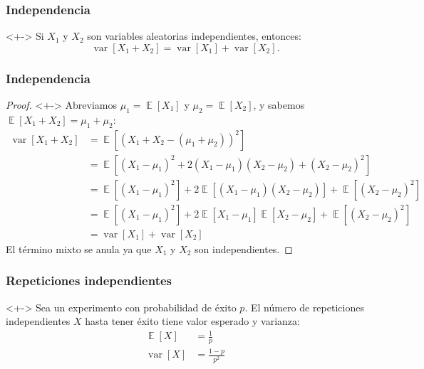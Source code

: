 \documentclass[english, spanish, fleqn,%
hyperref = {colorlinks, urlcolor = blue}%
]{beamer}
\DeclareMathOperator{\Exp}{\mathbb{E}}
\DeclareMathOperator{\var}{var}
\begin{document}
\begin{frame}
  \setcounter{beamerpauses}{2}
  \frametitle{Independencia}

  \begin{theorem}<+->
    Si \(X_1\) y \(X_2\) son variables aleatorias independientes,
    entonces:
    \begin{equation*}
      \var[X_1 + X_2]
        = \var[X_1] + \var[X_2].
    \end{equation*}
  \end{theorem}
\end{frame}

\begin{frame}
  \setcounter{beamerpauses}{2}
  \frametitle{Independencia}

  \begin{proof}<+->
    Abreviamos \(\mu_1 = \Exp[X_1]\) y \(\mu_2 = \Exp[X_2]\),
    y sabemos \(\Exp[X_1 + X_2] = \mu_1 + \mu_2\):
    \begin{align*}
      \var[X_1 + X_2]
        &= \Exp[(X_1 + X_2 - (\mu_1 + \mu_2))^2] \\
        &= \Exp[(X_1 - \mu_1)^2
                   + 2 (X_1 - \mu_1) (X_2 - \mu_2)
                   + (X_2 - \mu_2)^2] \\
       &= \Exp[(X_1 - \mu_1)^2]
            + 2 \Exp[(X_1 - \mu_1)(X_2 - \mu_2)]
            + \Exp[(X_2 - \mu_2)^2] \\
       &= \Exp[(X_1 - \mu_1)^2]
            + 2 \Exp[X_1 - \mu_1] \Exp[X_2 - \mu_2]
            + \Exp[(X_2 - \mu_2)^2] \\
       &= \var[X_1] + \var[X_2]
    \end{align*}
    El término mixto se anula ya que \(X_1\) y \(X_2\) son independientes.
  \end{proof}
\end{frame}

\begin{frame}
  \setcounter{beamerpauses}{2}
  \frametitle{Repeticiones independientes}

  \begin{theorem}<+->
     \label{theo:repeat}
     Sea un experimento con probabilidad de éxito \(p\).
     El número de repeticiones independientes \(X\) hasta tener éxito
     tiene valor esperado y varianza:
     \begin{align*}
       \Exp[X]
         &= \frac{1}{p} \\
       \var[X]
         &= \frac{1 - p}{p^2}
     \end{align*}
  \end{theorem}
\end{frame}
\end{document}
